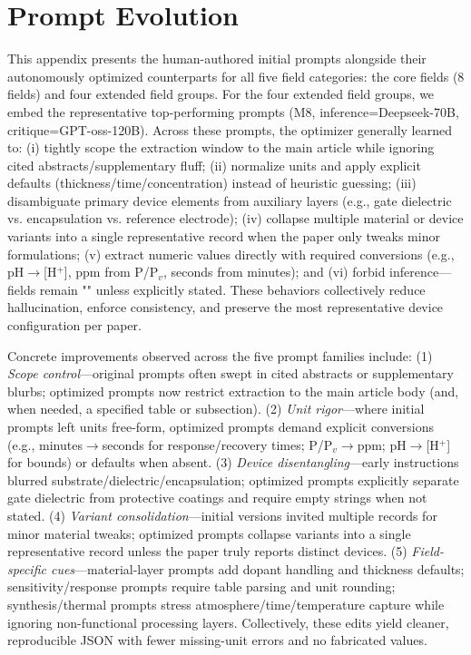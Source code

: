 \section{Prompt Evolution}
\label{sec:prompt-evolution}

This appendix presents the human-authored initial prompts alongside their autonomously optimized counterparts for all five field categories: the core fields (8 fields) and four extended field groups. For the four extended field groups, we embed the representative top-performing prompts (M8, inference=Deepseek-70B, critique=GPT-oss-120B). Across these prompts, the optimizer generally learned to: (i) tightly scope the extraction window to the main article while ignoring cited abstracts/supplementary fluff; (ii) normalize units and apply explicit defaults (thickness/time/concentration) instead of heuristic guessing; (iii) disambiguate primary device elements from auxiliary layers (e.g., gate dielectric vs. encapsulation vs. reference electrode); (iv) collapse multiple material or device variants into a single representative record when the paper only tweaks minor formulations; (v) extract numeric values directly with required conversions (e.g., pH$\rightarrow$[H$^+$], ppm from P/P$_v$, seconds from minutes); and (vi) forbid inference---fields remain "" unless explicitly stated. These behaviors collectively reduce hallucination, enforce consistency, and preserve the most representative device configuration per paper.

Concrete improvements observed across the five prompt families include: (1) \textit{Scope control}---original prompts often swept in cited abstracts or supplementary blurbs; optimized prompts now restrict extraction to the main article body (and, when needed, a specified table or subsection). (2) \textit{Unit rigor}---where initial prompts left units free-form, optimized prompts demand explicit conversions (e.g., minutes$\rightarrow$seconds for response/recovery times; P/P$_v$$\rightarrow$ppm; pH$\rightarrow$[H$^+$] for bounds) or defaults when absent. (3) \textit{Device disentangling}---early instructions blurred substrate/dielectric/encapsulation; optimized prompts explicitly separate gate dielectric from protective coatings and require empty strings when not stated. (4) \textit{Variant consolidation}---initial versions invited multiple records for minor material tweaks; optimized prompts collapse variants into a single representative record unless the paper truly reports distinct devices. (5) \textit{Field-specific cues}---material-layer prompts add dopant handling and thickness defaults; sensitivity/response prompts require table parsing and unit rounding; synthesis/thermal prompts stress atmosphere/time/temperature capture while ignoring non-functional processing layers. Collectively, these edits yield cleaner, reproducible JSON with fewer missing-unit errors and no fabricated values.

